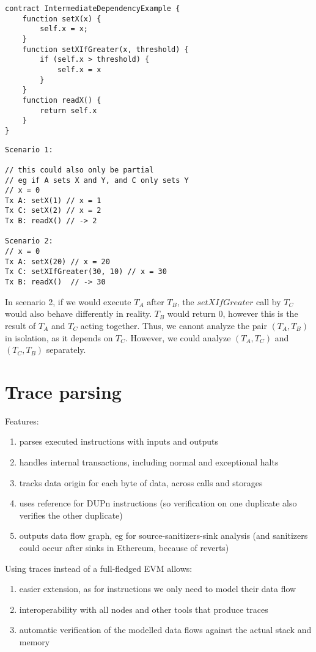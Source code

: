 \documentclass[draft,final]{vutinfth} %
\begin{document}
\begin{verbatim}
contract IntermediateDependencyExample {
    function setX(x) {
        self.x = x;
    }
    function setXIfGreater(x, threshold) {
        if (self.x > threshold) {
            self.x = x
        }
    }
    function readX() {
        return self.x
    }
}
\end{verbatim}

\begin{verbatim}
Scenario 1:

// this could also only be partial
// eg if A sets X and Y, and C only sets Y
// x = 0
Tx A: setX(1) // x = 1
Tx C: setX(2) // x = 2
Tx B: readX() // -> 2

Scenario 2:
// x = 0
Tx A: setX(20) // x = 20
Tx C: setXIfGreater(30, 10) // x = 30
Tx B: readX()  // -> 30
\end{verbatim}

In scenario 2, if we would execute $T_A$ after $T_B$, the $setXIfGreater$ call by $T_C$ would also behave differently in reality. $T_B$ would return $0$, however this is the result of $T_A$ and $T_C$ acting together. Thus, we canont analyze the pair $(T_A, T_B)$ in isolation, as it depends on $T_C$. However, we could analyze $(T_A, T_C)$ and $(T_C, T_B)$ separately.

\section{Trace parsing}

Features:

\begin{enumerate}
    \item parses executed instructions with inputs and outputs
    \item handles internal transactions, including normal and exceptional halts
    \item tracks data origin for each byte of data, across calls and storages
    \item uses reference for DUPn instructions (so verification on one duplicate also verifies the other duplicate)
    \item outputs data flow graph, eg for source-sanitizers-sink analysis (and sanitizers could occur after sinks in Ethereum, because of reverts)
\end{enumerate}

Using traces instead of a full-fledged EVM allows:

\begin{enumerate}
    \item easier extension, as for instructions we only need to model their data flow
    \item interoperability with all nodes and other tools that produce traces
    \item automatic verification of the modelled data flows against the actual stack and memory
\end{enumerate}
\end{document}
